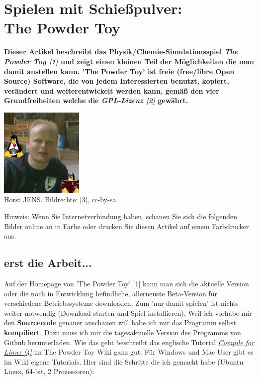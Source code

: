 \section*{Spielen mit Schießpulver: \\
The Powder Toy}
\label{powdertoy}

\textbf{Dieser Artikel beschreibt das Physik/Chemie-Simulationsspiel \textit{The Powder Toy [1]} und zeigt einen kleinen Teil der Möglichkeiten die man damit anstellen kann. 'The Powder Toy' ist freie (free/libre Open Source) Software, die von jedem Interessierten benutzt, kopiert, verändert und weiterentwickelt werden kann, gemäß den vier Grundfreiheiten welche die \textit{GPL-Lizenz [2]} gewährt.}

\begin{center}
\includegraphics[width=4cm]{horst2011mitdoppeltux.jpg} \\
\footnotesize{Horst JENS. Bildrechte: [3], cc-by-sa}
\end{center}


{Hinweis:} Wenn Sie Internetverbindung haben, schauen Sie sich die folgenden Bilder online an in Farbe oder drucken Sie diesen Artikel auf einem Farbdrucker aus.

\subsection*{erst die Arbeit...}

Auf der Homepage von 'The Powder Toy' [1] kann man sich die aktuelle Version oder die noch in Entwicklung befindliche, allerneuste Beta-Version für verschiedene Betriebssysteme downloaden. Zum 'nur damit spielen' ist nichts weiter notwendig (Download starten und Spiel installieren). Weil ich vorhabe mir den \textbf{Sourcecode} genauer anschauen will habe ich mir das Programm selbst \textbf{kompiliert}. Dazu muss ich mir die tagesaktuelle Version des Programms von Github herunterladen. Wie das geht beschreibt das englische Tutorial \href{http://goo.gl/LK4z01}{\textit{Compile for Linux [4]}} im The Powder Toy Wiki ganz gut. Für Windows und Mac User gibt es im Wiki eigene Tutorials. Hier sind die Schritte die ich gemacht habe (Ubuntu Linux, 64-bit, 2 Prozessoren):

